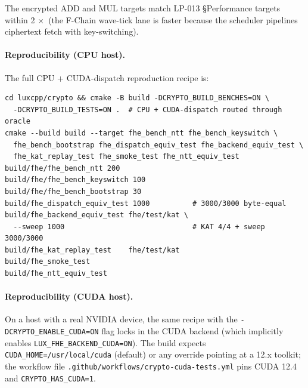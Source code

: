 The encrypted ADD and MUL targets match LP-013 \S Performance targets
within 2$\,\times$ (the F-Chain wave-tick lane is faster because the
scheduler pipelines ciphertext fetch with key-switching).

\paragraph{Reproducibility (CPU host).}
The full CPU + CUDA-dispatch reproduction recipe is:
\begin{verbatim}
cd luxcpp/crypto && cmake -B build -DCRYPTO_BUILD_BENCHES=ON \
  -DCRYPTO_BUILD_TESTS=ON .  # CPU + CUDA-dispatch routed through oracle
cmake --build build --target fhe_bench_ntt fhe_bench_keyswitch \
  fhe_bench_bootstrap fhe_dispatch_equiv_test fhe_backend_equiv_test \
  fhe_kat_replay_test fhe_smoke_test fhe_ntt_equiv_test
build/fhe/fhe_bench_ntt 200
build/fhe/fhe_bench_keyswitch 100
build/fhe/fhe_bench_bootstrap 30
build/fhe_dispatch_equiv_test 1000          # 3000/3000 byte-equal
build/fhe_backend_equiv_test fhe/test/kat \
  --sweep 1000                              # KAT 4/4 + sweep 3000/3000
build/fhe_kat_replay_test    fhe/test/kat
build/fhe_smoke_test
build/fhe_ntt_equiv_test
\end{verbatim}

\paragraph{Reproducibility (CUDA host).}
On a host with a real NVIDIA device, the same recipe with the
\texttt{-DCRYPTO\_ENABLE\_CUDA=ON} flag locks in the CUDA backend
(which implicitly enables \texttt{LUX\_FHE\_BACKEND\_CUDA=ON}). The
build expects \texttt{CUDA\_HOME=/usr/local/cuda} (default) or any
override pointing at a 12.x toolkit; the workflow file
\texttt{.github/workflows/crypto-cuda-tests.yml} pins CUDA 12.4 and
\texttt{CRYPTO\_HAS\_CUDA=1}.

